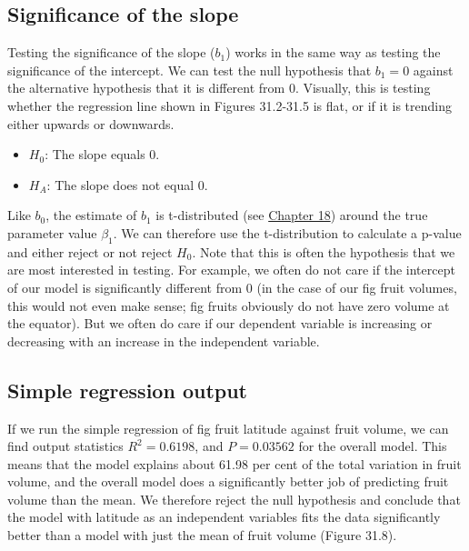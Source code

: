 \documentclass[
]{scrbook}
\providecommand{\tightlist}{%
  \setlength{\itemsep}{0pt}\setlength{\parskip}{0pt}}
\begin{document}
\hypertarget{significance-of-the-slope}{%
\subsection{Significance of the slope}\label{significance-of-the-slope}}

Testing the significance of the slope (\(b_{1}\)) works in the same way as testing the significance of the intercept.
We can test the null hypothesis that \(b_{1} = 0\) against the alternative hypothesis that it is different from 0.
Visually, this is testing whether the regression line shown in Figures 31.2-31.5 is flat, or if it is trending either upwards or downwards.

\begin{itemize}
\tightlist
\item
  \(H_{0}\): The slope equals 0.
\item
  \(H_{A}\): The slope does not equal 0.
\end{itemize}

Like \(b_{0}\), the estimate of \(b_{1}\) is t-distributed (see \protect\hyperlink{Chapter_18}{Chapter 18}) around the true parameter value \(\beta_{1}\).
We can therefore use the t-distribution to calculate a p-value and either reject or not reject \(H_{0}\).
Note that this is often the hypothesis that we are most interested in testing.
For example, we often do not care if the intercept of our model is significantly different from 0 (in the case of our fig fruit volumes, this would not even make sense; fig fruits obviously do not have zero volume at the equator).
But we often do care if our dependent variable is increasing or decreasing with an increase in the independent variable.

\hypertarget{simple-regression-output}{%
\subsection{Simple regression output}\label{simple-regression-output}}

If we run the simple regression of fig fruit latitude against fruit volume, we can find output statistics \(R^{2} = 0.6198\), and \(P = 0.03562\) for the overall model.
This means that the model explains about 61.98 per cent of the total variation in fruit volume, and the overall model does a significantly better job of predicting fruit volume than the mean.
We therefore reject the null hypothesis and conclude that the model with latitude as an independent variables fits the data significantly better than a model with just the mean of fruit volume (Figure 31.8).
\end{document}
